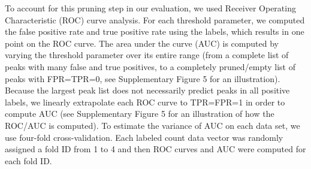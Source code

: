 \documentclass[twoside,11pt]{article}
\begin{document}
To account for this pruning step in our evaluation, we used Receiver
Operating Characteristic (ROC) curve analysis. For each threshold
parameter, we computed the false positive rate and true positive rate
using the labels, which results in one point on the ROC curve. The
area under the curve (AUC) is computed by varying the threshold
parameter over its entire range (from a complete list of peaks with
many false and true positives, to a completely pruned/empty list of
peaks with FPR=TPR=0, see Supplementary Figure 5 for an illustration).
Because the largest peak list does not necessarily predict peaks in
all positive labels, we linearly extrapolate each ROC curve to
TPR=FPR=1 in order to compute AUC (see Supplementary Figure 5 for an
illustration of how the ROC/AUC is computed). To estimate the variance
of AUC on each data set, we use four-fold cross-validation. Each
labeled count data vector was randomly assigned a fold ID from 1 to 4
and then ROC curves and AUC were computed for each fold ID.



 
\end{document}
